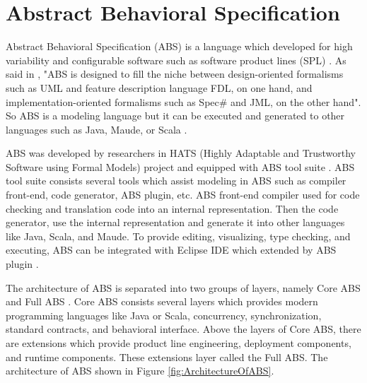 \section{Abstract Behavioral Specification}
Abstract Behavioral Specification (ABS) is a language which developed for high variability and configurable software such as software product lines (SPL) \citep{paper.clarke.variability,paper.hanle.ABStutorial}. As said in \citep{paper.clarke.variability}, "ABS is designed to fill the niche between design-oriented formalisms such as UML and feature description language FDL, on one hand, and implementation-oriented formalisms such as Spec\# and JML, on the other hand". So ABS is a modeling language but it can be executed and generated to other languages such as Java, Maude, or Scala \citep{paper.hanle.ABStutorial}.

ABS was developed by researchers in HATS (Highly Adaptable and Trustworthy Software using Formal Models) project \citep{thesis.niken.deltaRelationalMappingUsingABS} and equipped with ABS tool suite \citep{paper.wong.abstools}. ABS tool suite consists several tools which assist modeling in ABS such as compiler front-end, code generator, ABS plugin, etc. ABS front-end compiler used for code checking and translation code into an internal representation. Then the code generator, use the internal representation and generate it into other languages like Java, Scala, and Maude. To provide editing, visualizing, type checking, and executing, ABS can be integrated with Eclipse IDE which extended by ABS plugin \citep{paper.wong.abstools}.

The architecture of ABS is separated into two groups of layers, namely Core ABS and Full ABS \cite{paper.hanle.ABStutorial}. Core ABS consists several layers which provides modern programming languages like Java or Scala, concurrency, synchronization, standard contracts, and behavioral interface. Above the layers of Core ABS, there are extensions which provide product line engineering, deployment components, and runtime components. These extensions layer called the Full ABS. The architecture of ABS shown in Figure \ref{fig:ArchitectureOfABS}.

